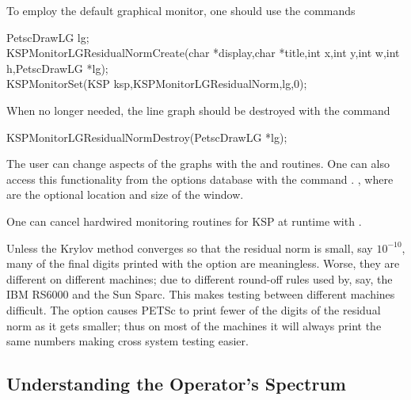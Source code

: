 To employ the default graphical monitor, one should use the
commands
\begin{tabbing}
   PetscDrawLG lg;\\
  KSPMonitorLGResidualNormCreate(char *display,char *title,int x,int y,int w,int h,PetscDrawLG *lg);\\
  KSPMonitorSet(KSP ksp,KSPMonitorLGResidualNorm,lg,0);
\end{tabbing}
When no longer needed, the line graph should be destroyed
with the command
\begin{tabbing}
  KSPMonitorLGResidualNormDestroy(PetscDrawLG *lg);
\end{tabbing}
The user can change aspects of the graphs with the  and
 routines.  
One can also access this functionality from the options database
with the command  \trl{[x,y,w,h]}. ,
where  are the optional location and size of the window.

One can cancel hardwired monitoring routines for KSP at runtime with
. 

Unless the Krylov method converges so that the residual norm is small,
say $ 10^{-10} $, many of the final digits printed with the 
option are meaningless. Worse, they are different on different
machines; due to different round-off rules used by, say, the IBM RS6000
and the Sun Sparc. This makes testing between different machines
difficult. The option  
causes PETSc to print fewer of the digits of the residual norm
as it gets smaller; thus on most of the machines it will always
print the same numbers making cross system testing easier.


\subsection{Understanding the Operator's Spectrum}

